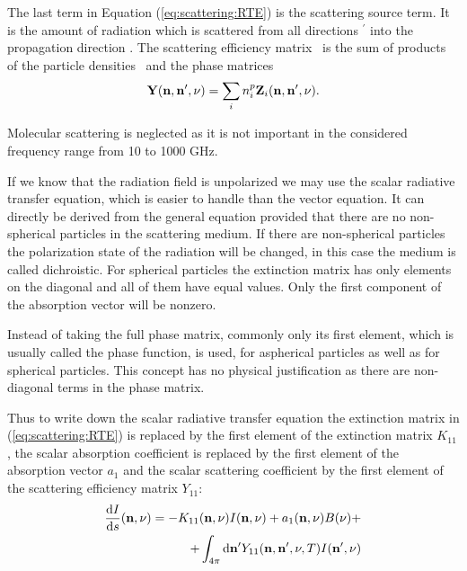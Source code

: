 The last term in Equation (\ref{eq:scattering:RTE}) is the scattering
source term. It is the amount of radiation which is scattered from all
directions \PDir$^\prime$ into the propagation direction \PDir.  The
scattering efficiency matrix \SEfMat\ is the sum of products of the
particle densities \PDen\ and the phase matrices \PhaMat
\begin{eqnarray}
{\bf Y}({\bf n}, {\bf n}', \nu) = \sum_i{n^p_i{\bf Z}_i({\bf n},
  {\bf n}', \nu)}.
\end{eqnarray}

Molecular scattering is neglected as it is not important in the
considered frequency range from 10 to 1000 GHz.


\label{sec:scattering:scalar_rte}

If we know that the radiation field is unpolarized we may use the
scalar radiative transfer equation, which is easier to handle than the
vector equation. It can directly be derived from the general equation
provided that there are no non-spherical particles in the scattering
medium. If there are non-spherical particles the polarization state of
the radiation will be changed, in this case the medium is called
dichroistic.  For spherical particles the extinction matrix has only
elements on the diagonal and all of them have equal values. Only the
first component of the absorption vector will be nonzero.

Instead of taking the full phase matrix, commonly only its first
element, which is usually called the phase function, is used, for
aspherical particles as well as for spherical particles. This concept
has no physical justification as there are non-diagonal terms in the
phase matrix.

Thus to write down the scalar radiative transfer equation the
extinction matrix in (\ref{eq:scattering:RTE}) is replaced by the
first element of the extinction matrix $K_{11}$, the scalar absorption
coefficient is replaced by the first element of the absorption vector
$a_1$ and the scalar scattering coefficient by the first element of
the scattering efficiency matrix $Y_{11}$:
\begin{eqnarray}
  \label{eq:scattering:scalar_rte}
\frac{\mathrm{d} I}{\mathrm{d} s} ({\bf n}, \nu) = -K_{11}({\bf n}, \nu)I
({\bf n}, \nu) + a_1({\bf n}, \nu)B(\nu) + \\ \nonumber
 +\int_{4\pi} \mathrm{d} {\bf n}^\prime Y_{11}({\bf n}, {\bf n}^\prime, \nu, T) I({\bf n}^\prime,
  \nu)
\end{eqnarray}


